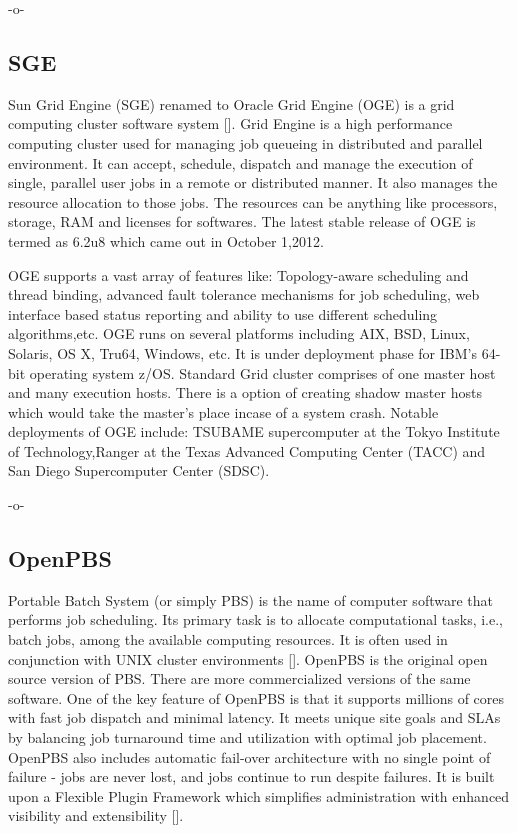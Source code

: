      -o-

     
\subsection{SGE}

Sun Grid Engine (SGE) renamed to Oracle Grid Engine (OGE) is a grid
computing cluster software system [\cite{www-sge-wiki}]. Grid Engine is
a high performance computing cluster used for managing job queueing in
distributed and parallel environment. It can accept, schedule,
dispatch and manage the execution of single, parallel user jobs in a
remote or distributed manner. It also manages the resource allocation
to those jobs. The resources can be anything like processors, storage,
RAM and licenses for softwares. The latest stable release of OGE is
termed as 6.2u8 which came out in October 1,2012.

OGE supports a vast array of features like: Topology-aware scheduling
and thread binding, advanced fault tolerance mechanisms for job
scheduling, web interface based status reporting and ability to use
different scheduling algorithms,etc. OGE runs on several platforms
including AIX, BSD, Linux, Solaris, OS X, Tru64, Windows, etc. It is
under deployment phase for IBM's 64-bit operating system
z/OS. Standard Grid cluster comprises of one master host and many
execution hosts. There is a option of creating shadow master hosts
which would take the master's place incase of a system crash. Notable
deployments of OGE include: TSUBAME supercomputer at the Tokyo
Institute of Technology,Ranger at the Texas Advanced Computing Center
(TACC) and San Diego Supercomputer Center (SDSC).

     -o-

\subsection{OpenPBS}

Portable Batch System (or simply PBS) is the name of computer software
that performs job scheduling. Its primary task is to allocate
computational tasks, i.e., batch jobs, among the available computing
resources. It is often used in conjunction with UNIX cluster
environments [\cite{openpbs-wiki}]. OpenPBS is the original open source
version of PBS. There are more commercialized versions of the same
software. One of the key feature of OpenPBS is that it supports
millions of cores with fast job dispatch and minimal latency. It meets
unique site goals and SLAs by balancing job turnaround time and
utilization with optimal job placement. OpenPBS also includes
automatic fail-over architecture with no single point of failure -
jobs are never lost, and jobs continue to run despite failures. It is
built upon a Flexible Plugin Framework which simplifies administration
with enhanced visibility and extensibility [\cite{openpbs-www}].

